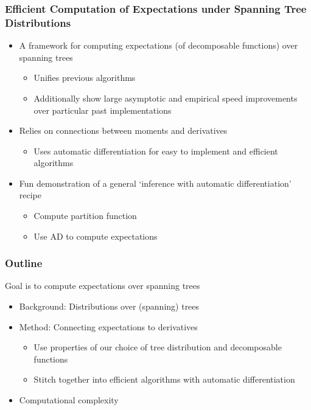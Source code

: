 \documentclass{beamer}
\begin{document}
\begin{frame}
\frametitle{Efficient Computation of Expectations under Spanning Tree Distributions}
\begin{itemize}
\item A framework for computing expectations (of decomposable functions) over spanning trees
    \begin{itemize}
    \item Unifies previous algorithms
    \item Additionally show large asymptotic
        and empirical speed improvements over particular past implementations
    \end{itemize}
\item Relies on connections between moments and derivatives
    \begin{itemize}
    \item Uses automatic differentiation for easy to implement and efficient algorithms
    \end{itemize}
\item Fun demonstration of a general `inference with automatic differentiation'
    recipe
    \begin{itemize}
    \item Compute partition function
    \item Use AD to compute expectations
    \end{itemize}
\end{itemize}
\end{frame}

\begin{frame}
\frametitle{Outline}

Goal is to compute expectations over spanning trees
\begin{itemize}
\item Background: Distributions over (spanning) trees
\item Method: Connecting expectations to derivatives
    \begin{itemize}
    \item Use properties of our choice of tree distribution and decomposable functions
    \item Stitch together into efficient algorithms with automatic differentiation
    \end{itemize}
\item Computational complexity
\end{itemize}
\end{frame}
\end{document}
